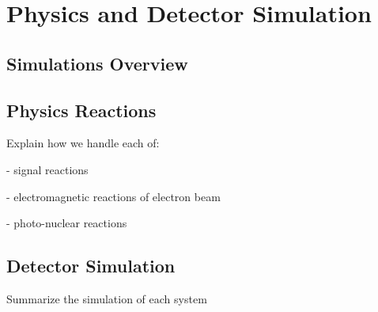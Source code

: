 \section{Physics and Detector Simulation}

\subsection{Simulations Overview}

\subsection{Physics Reactions}

Explain how we handle each of: 

- signal reactions

- electromagnetic reactions of electron beam

- photo-nuclear reactions

\subsection{Detector Simulation}

Summarize the simulation of each system 
